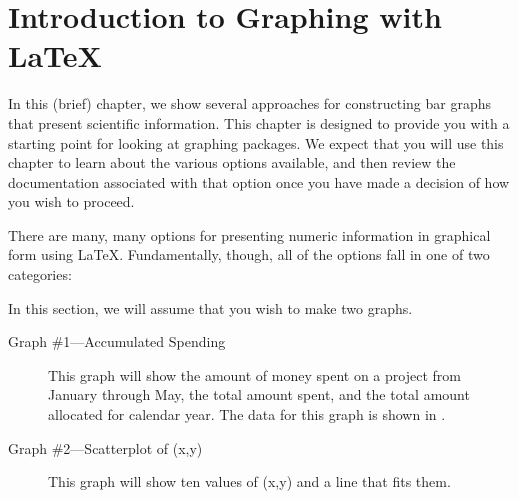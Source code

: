 \chapter{Introduction to Graphing with \LaTeX}
In this (brief) chapter, we show several approaches for constructing
bar graphs that present scientific information. This chapter is
designed to provide you with a starting point for looking at graphing
packages. We expect that you will use this chapter to learn about the
various options available, and then review the documentation
associated with that option once you have made a decision of how you
wish to proceed.

There are many, many options for presenting numeric information in
graphical form using \LaTeX. Fundamentally, though, all of the options
fall in one of two categories:


In this section, we will assume that you wish to make two graphs.

\begin{description}
\item[Graph \#1---Accumulated Spending] This graph will show the
  amount of money spent on a project from January through May, the
  total amount spent, and the total amount allocated for calendar
  year. The data for this graph is shown in .
\item[Graph \#2---Scatterplot of (x,y)] This graph will show ten
  values of (x,y) and a line that fits them.
\end{description}
